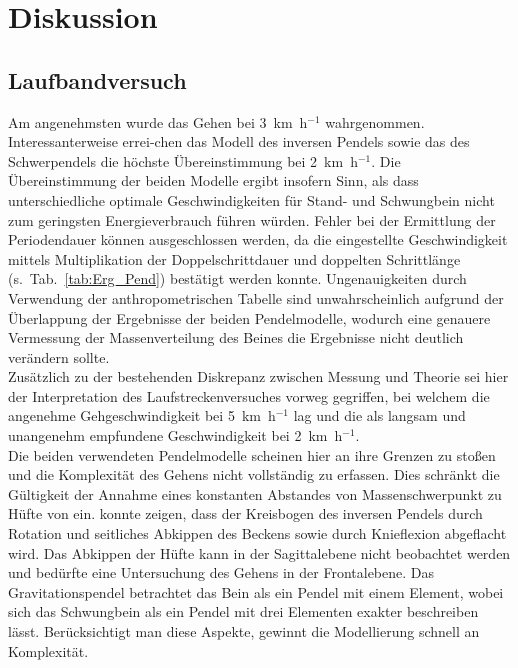 \section{Diskussion}
\subsection{Laufbandversuch}
Am angenehmsten wurde das Gehen bei 3~km~h$^{-1}$ wahrgenommen. Interessanterweise errei-chen das Modell des inversen Pendels sowie das des Schwerpendels die höchste Übereinstimmung bei 2~km~h$^{-1}$. Die Übereinstimmung der beiden Modelle ergibt insofern Sinn, als dass unterschiedliche optimale Geschwindigkeiten für Stand- und Schwungbein nicht zum geringsten Energieverbrauch führen würden. Fehler bei der Ermittlung der Periodendauer können ausgeschlossen werden, da die eingestellte Geschwindigkeit mittels Multiplikation der Doppelschrittdauer und doppelten Schrittlänge (s.~Tab.~\ref{tab:Erg_Pend}) bestätigt werden konnte. 
Ungenauigkeiten durch Verwendung der anthropometrischen Tabelle sind unwahrscheinlich aufgrund der Überlappung der Ergebnisse der beiden Pendelmodelle, wodurch eine genauere Vermessung der Massenverteilung des Beines die Ergebnisse nicht deutlich verändern sollte.\\
Zusätzlich zu der bestehenden Diskrepanz zwischen Messung und Theorie sei hier der Interpretation des Laufstreckenversuches vorweg gegriffen, bei welchem die angenehme Gehgeschwindigkeit bei 5~km~h$^{-1}$ lag und die als langsam und unangenehm empfundene Geschwindigkeit bei 2~km~h$^{-1}$.\\
Die beiden verwendeten Pendelmodelle scheinen hier an ihre Grenzen zu stoßen und die Komplexität des Gehens nicht vollständig zu erfassen. Dies schränkt die Gültigkeit der Annahme eines konstanten Abstandes von Massenschwerpunkt zu Hüfte von \textcite{witte1992mechanische} ein. \textcite{mcmahon1984muscles} konnte zeigen, dass der Kreisbogen des inversen Pendels durch Rotation und seitliches Abkippen des Beckens sowie durch Knieflexion abgeflacht wird. Das Abkippen der Hüfte kann in der Sagittalebene nicht beobachtet werden und bedürfte eine Untersuchung des Gehens in der Frontalebene. Das Gravitationspendel betrachtet das Bein als ein Pendel mit einem Element, wobei sich das Schwungbein als ein Pendel mit drei Elementen exakter beschreiben lässt. Berücksichtigt man diese Aspekte, gewinnt die Modellierung schnell an Komplexität.\\

